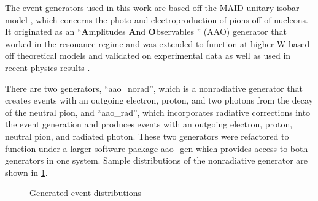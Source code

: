 The event generators used in this work are based off the MAID unitary isobar model \parencite{Tiator2006MAIDTechniques}, \parencite{Dreschsel1992ThresholdNucleons} which concerns the photo and electroproduction of pions off of nucleons. It originated as an ``\textbf{A}mplitudes \textbf{A}nd \textbf{O}bservables '' (AAO) generator that worked in the resonance regime \parencite{Burkert1991AmplitudesGenerator} and was extended to function at higher W based off theoretical models \parencite{Goloskokov2010AnElectroproduction} and validated on experimental data \parencite{Bedlinskiy2014ExclusiveCLAS} as well as used in recent physics results \parencite{Diehl2022MultidimensionalRegion}. 

There are two generators, ``aao\_norad'', which is a nonradiative generator that creates events with an outgoing electron, proton, and two photons from the decay of the neutral pion, and ``aao\_rad'', which incorporates radiative corrections into the event generation and produces events with an outgoing electron, proton, neutral pion, and radiated photon. These two generators were refactored to function under a larger software package \href{https://github.com/JeffersonLab/aao_gen}{aao\_gen} which provides access to both generators in one system. Sample distributions of the nonradiative generator are shown in \ref{fig:aao_norad_gen}.

    \begin{figure}[H]
        \centering
        \hfill
        \caption[Generated Event Distributions]{Generated event distributions}\label{fig:aao_norad_gen}
    \end{figure}


